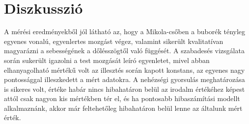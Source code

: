 \documentclass[10pt,pdftex]{report}
\begin{document}
\section*{Diszkusszió}
A mérési eredményekből jól látható az, hogy a Mikola-csőben a buborék tényleg egyenes vonalú, egyenlertes mozgást végez, valamint sikerült kvalitatívan magyarázni a sebességének a dőlésszögtől való függését. A szabadesés vizsgálata során sukerült igazolni a test mozgását leíró egyenletet, mivel abban elhanyagolható mértékű volt az illesztés során kapott konstans, az egyenes nagy pontossággal illeszkedett a mért adatokra. A nehézségi gyorsulás meghatározása is sikeres volt, értéke habár nincs hibahatáron belül az irodalm értékéhez képest attól csak nagyon kis mértékben tér el, és ha pontosabb hibaszámítási modellt alkalmaznánk, akkor már feltehetőleg hibahatáron belül lenne az általunk mért érték.
\end{document}
